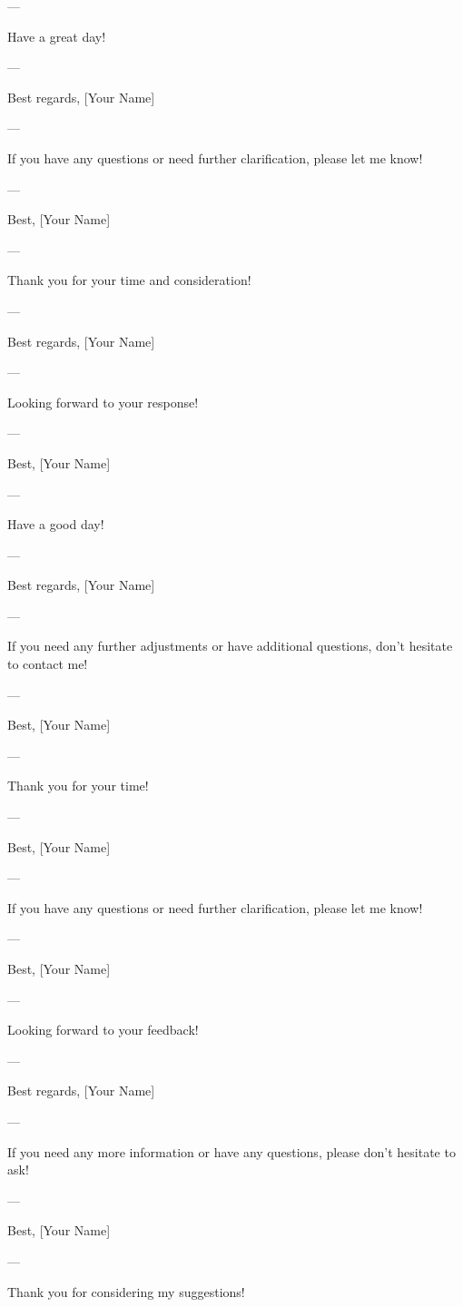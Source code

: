 --- 

Have a great day! 

--- 

Best regards,  
[Your Name]  

--- 

If you have any questions or need further clarification, please let me know! 

--- 

Best,  
[Your Name]  

--- 

Thank you for your time and consideration! 

--- 

Best regards,  
[Your Name]  

--- 

Looking forward to your response! 

--- 

Best,  
[Your Name]  

--- 

Have a good day! 

--- 

Best regards,  
[Your Name]  

--- 

If you need any further adjustments or have additional questions, don't hesitate to contact me! 

--- 

Best,  
[Your Name]  

--- 

Thank you for your time! 

--- 

Best,  
[Your Name]  

--- 

If you have any questions or need further clarification, please let me know! 

--- 

Best,  
[Your Name]  

--- 

Looking forward to your feedback! 

--- 

Best regards,  
[Your Name]  

--- 

If you need any more information or have any questions, please don't hesitate to ask! 

--- 

Best,  
[Your Name]  

--- 

Thank you for considering my suggestions! 

